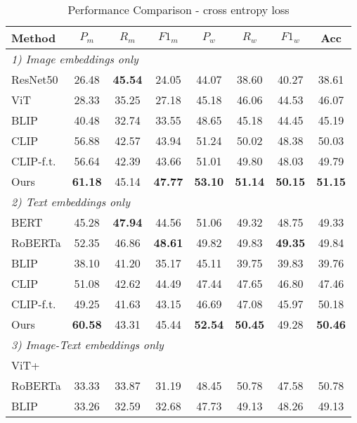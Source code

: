 \begin{table}
    \centering
    \caption{Performance Comparison -  cross entropy loss}
    \label{tab: performance comparison}

    \begin{tabular}{lccccccc}

    Method & $P_m$ & $R_m$ & $F1_m$ & $P_w$ & $R_w$ & $F1_w$ & Acc \\ 
    \hline
    \multicolumn{8}{l}{\emph{1) Image embeddings only}} \\ 

    ResNet50 & 26.48 & \textbf{45.54} & 24.05 & 44.07 & 38.60 & 40.27 & 38.61\\
    ViT & 28.33 & 35.25 & 27.18 & 45.18 & 46.06 & 44.53& 46.07 \\

    BLIP & 40.48 & 32.74 & 33.55 & 48.65 & 45.18 & 44.45 & 45.19 \\
    \hline
    CLIP & 56.88 & 42.57 & 43.94 & 51.24 & 50.02 & 48.38 & 50.03   \\
    CLIP-f.t. & 56.64 & 42.39 & 43.66 & 51.01 & 49.80 & 48.03 & 49.79 \\
    Ours & \textbf{61.18} & 45.14 & \textbf{47.77} & \textbf{53.10} & \textbf{51.14} & \textbf{50.15} & \textbf{51.15} \\
    \hline
    \hline
    \multicolumn{8}{l}{\emph{2) Text embeddings only}}\\

    BERT & 45.28 & \textbf{47.94} & 44.56 & 51.06 & 49.32 & 48.75 & 49.33 \\
    RoBERTa & 52.35 & 46.86 & \textbf{48.61} & 49.82 & 49.83 & \textbf{49.35} & 49.84 \\
    BLIP & 38.10 & 41.20 & 35.17 & 45.11 & 39.75 & 39.83 & 39.76 \\

    \hline
    CLIP & 51.08 & 42.62 & 44.49 & 47.44 & 47.65 & 46.80 & 47.46   \\
    CLIP-f.t. & 49.25 & 41.63 & 43.15 & 46.69 & 47.08 & 45.97 & 50.18 \\
    Ours & \textbf{60.58} & 43.31 & 45.44 & \textbf{52.54} & \textbf{50.45} & 49.28 & \textbf{50.46} \\
    \hline
    \hline
    \multicolumn{8}{l}{\emph{3) Image-Text embeddings only}}\\

    ViT+ &  &  &  &  &  &  &  \\
    RoBERTa & 33.33 & 33.87 & 31.19 & 48.45 & 50.78 & 47.58 & 50.78 \\
    BLIP & 33.26 & 32.59 & 32.68 & 47.73 & 49.13 & 48.26 & 49.13 \\
    \hline
    

\end{tabular}
\end{table}
